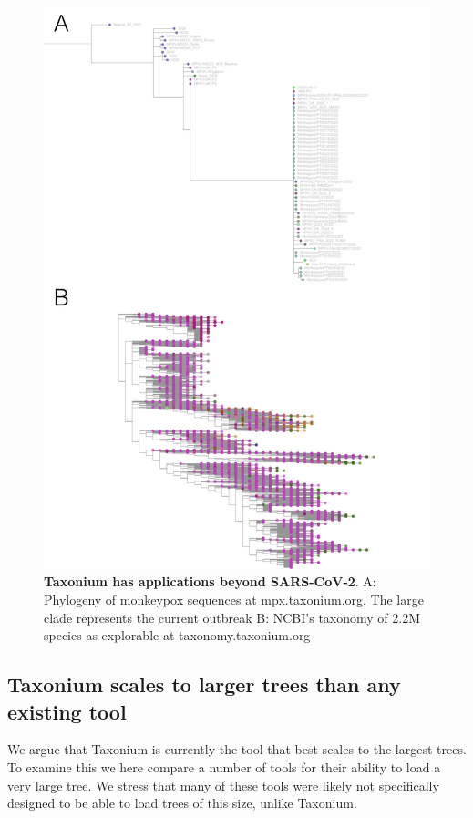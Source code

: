 \begin{figure}
\begin{center}
\includegraphics[width=\linewidth]{Figures/mpxtax.pdf}
\end{center}
\caption{
\textbf{Taxonium has applications beyond SARS-CoV-2}. A: Phylogeny of monkeypox sequences at mpx.taxonium.org. The large clade represents the current outbreak B: NCBI's taxonomy of 2.2M species as explorable at taxonomy.taxonium.org
}
\label{fig:cov2tree}
\end{figure}

\subsection*{Taxonium scales to larger trees than any existing tool}

We argue that Taxonium is currently the tool that best scales to the largest trees. To examine this we here compare a number of tools for their ability to load a very large tree. We stress that many of these tools were likely not specifically designed to be able to load trees of this size, unlike Taxonium.


